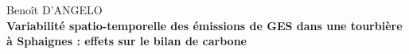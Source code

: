 {\parindent0pt %

\begin{center}
		\large{Benoît D'ANGELO}\\ 
		\textbf{Variabilité spatio-temporelle des émissions de GES dans une tourbière à Sphaignes : effets sur le bilan de carbone}
\end{center}

}
